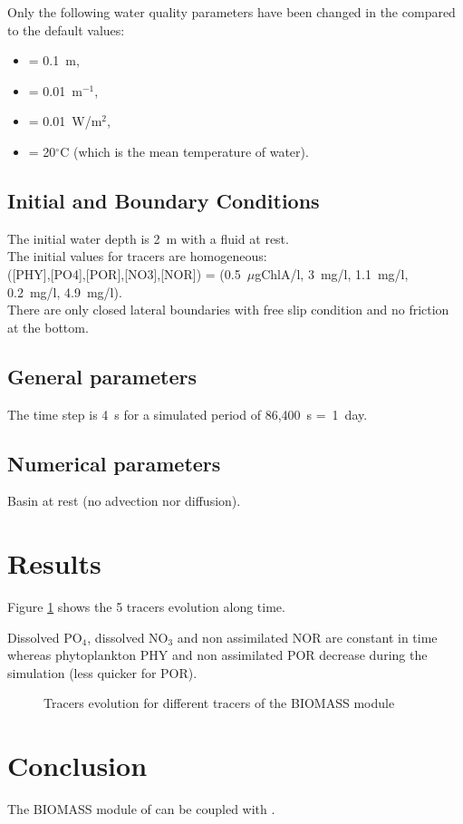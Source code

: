 Only the following water quality parameters have been changed
in the \waqtel {} compared to the default values:
\begin{itemize}
\item {} = 0.1~m,
\item {} = 0.01~m$^{-1}$,
\item {} = 0.01~W/m$^2$,
\item {} = 20$^\circ$C (which is the mean temperature of water).
\end{itemize}

\subsection{Initial and Boundary Conditions}

The initial water depth is 2~m with a fluid at rest.\\
%
The initial values for tracers are homogeneous:\\
([PHY],[PO4],[POR],[NO3],[NOR]) =
(0.5~$\mu$gChlA/l, 3~mg/l, 1.1~mg/l, 0.2~mg/l, 4.9~mg/l).\\
%
There are only closed lateral boundaries with free slip condition and no
friction at the bottom.

\subsection{General parameters}

The time step is 4~s for a simulated period of 86,400~s =~1~day.

\subsection{Numerical parameters}

Basin at rest (no advection nor diffusion).

\section{Results}

Figure \ref{fig:waq2d_biomas:res} shows the 5 tracers evolution along time.

Dissolved PO$_4$, dissolved NO$_3$ and non assimilated NOR are constant in time
whereas phytoplankton PHY and non assimilated POR decrease during the simulation
(less quicker for POR).

\begin{figure} [H]
\centering
{}
 \caption{Tracers evolution for different tracers of the BIOMASS module}
 \label{fig:waq2d_biomas:res}
\end{figure}

\section{Conclusion}

The BIOMASS module of \waqtel can be coupled with .
